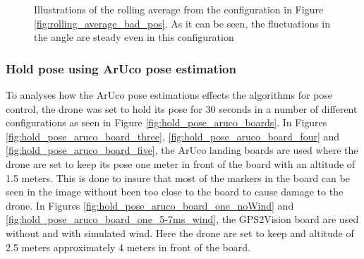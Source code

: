 \documentclass[../Head/report.tex]{subfiles}
\begin{document}
\begin{figure}[H]
\begin{subfigure}[t]{.30\textwidth}
        \caption{}
        \label{fig:rolling_average_in_yaw_test2}
    \end{subfigure}
    \caption{Illustrations of the rolling average from the configuration in Figure \ref{fig:rolling_average_bad_pos}. As it can be seen, the fluctuations in the angle are steady even in this configuration}
    \label{fig:rolling_average_angle_test2}
\end{figure}  

\subsubsection{Hold pose using ArUco pose estimation}
\label{sec:hold_pose_using_aruco_pose_estimation}

To analyses how the ArUco pose estimations effects the algorithms for pose control, the drone was set to hold its pose for 30 seconds in a number of different configurations as seen in Figure \ref{fig:hold_pose_aruco_boards}. In Figures \ref{fig:hold_pose_aruco_board_three}, \ref{fig:hold_pose_aruco_board_four} and \ref{fig:hold_pose_aruco_board_five}, the ArUco landing boards are used where the drone are set to keep its pose one meter in front of the board with an altitude of 1.5 meters. This is done to insure that most of the markers in the board can be seen in the image without been too close to the board to cause damage to the drone. In Figures \ref{fig:hold_pose_aruco_board_one_noWind} and \ref{fig:hold_pose_aruco_board_one_5-7ms_wind}, the GPS2Vision board are used without and with simulated wind. Here the drone are set to keep and altitude of 2.5 meters approximately 4 meters in front of the board.
\end{document}

